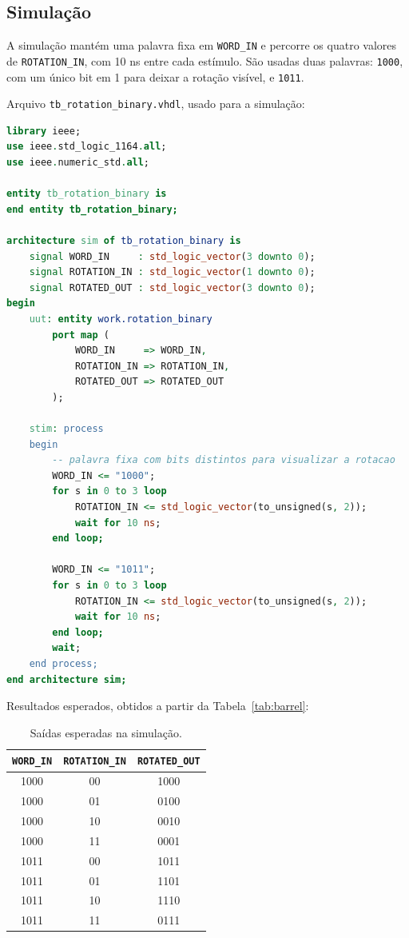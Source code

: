 \documentclass[report, 12pt]{uftreport}
\begin{document}
\subsection{Simulação}

A simulação mantém uma palavra fixa em \texttt{WORD\_IN} e percorre os quatro valores de \texttt{ROTATION\_IN}, com 10 ns entre cada estímulo. São usadas duas palavras: \texttt{1000}, com um único bit em 1 para deixar a rotação visível, e \texttt{1011}.

Arquivo \texttt{tb\_rotation\_binary.vhdl}, usado para a simulação:

\begin{lstlisting}[language=VHDL]
library ieee;
use ieee.std_logic_1164.all;
use ieee.numeric_std.all;

entity tb_rotation_binary is
end entity tb_rotation_binary;

architecture sim of tb_rotation_binary is
    signal WORD_IN     : std_logic_vector(3 downto 0);
    signal ROTATION_IN : std_logic_vector(1 downto 0);
    signal ROTATED_OUT : std_logic_vector(3 downto 0);
begin
    uut: entity work.rotation_binary
        port map (
            WORD_IN     => WORD_IN,
            ROTATION_IN => ROTATION_IN,
            ROTATED_OUT => ROTATED_OUT
        );

    stim: process
    begin
        -- palavra fixa com bits distintos para visualizar a rotacao
        WORD_IN <= "1000";
        for s in 0 to 3 loop
            ROTATION_IN <= std_logic_vector(to_unsigned(s, 2));
            wait for 10 ns;
        end loop;

        WORD_IN <= "1011";
        for s in 0 to 3 loop
            ROTATION_IN <= std_logic_vector(to_unsigned(s, 2));
            wait for 10 ns;
        end loop;
        wait;
    end process;
end architecture sim;
\end{lstlisting}

Resultados esperados, obtidos a partir da Tabela~\ref{tab:barrel}:

\begin{table}[htb]
  \centering
  \caption{Saídas esperadas na simulação.}
  \label{tab:sim}
  \begin{tabular}{c|c|c}
    \toprule
    \texttt{WORD\_IN} & \texttt{ROTATION\_IN} & \texttt{ROTATED\_OUT} \\
    \midrule
    1000 & 00 & 1000 \\
    1000 & 01 & 0100 \\
    1000 & 10 & 0010 \\
    1000 & 11 & 0001 \\
    \midrule
    1011 & 00 & 1011 \\
    1011 & 01 & 1101 \\
    1011 & 10 & 1110 \\
    1011 & 11 & 0111 \\
    \bottomrule
  \end{tabular}
\end{table}
\end{document}
